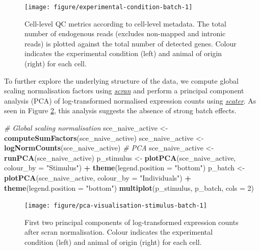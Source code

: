 \documentclass[9pt,a4paper,]{extarticle}
\newenvironment{Shaded}{\begin{snugshade}}{\end{snugshade}}
\newcommand{\CommentTok}[1]{\textcolor[rgb]{0.56,0.35,0.01}{\textit{#1}}}
\newcommand{\DataTypeTok}[1]{\textcolor[rgb]{0.13,0.29,0.53}{#1}}
\newcommand{\DecValTok}[1]{\textcolor[rgb]{0.00,0.00,0.81}{#1}}
\newcommand{\KeywordTok}[1]{\textcolor[rgb]{0.13,0.29,0.53}{\textbf{#1}}}
\newcommand{\NormalTok}[1]{#1}
\newcommand{\OperatorTok}[1]{\textcolor[rgb]{0.81,0.36,0.00}{\textbf{#1}}}
\newcommand{\StringTok}[1]{\textcolor[rgb]{0.31,0.60,0.02}{#1}}
\begin{document}
\begin{figure}

{\centering \texttt{[image: figure/experimental-condition-batch-1]} 

}

\caption{Cell-level QC metrics according to cell-level metadata. The total number of endogenous reads (excludes non-mapped and intronic reads) is plotted against the total number of detected genes. Colour indicates the experimental condition (left) and animal of origin (right) for each cell.}\label{fig:experimental-condition-batch}
\end{figure}

To further explore the underlying structure of the data, we compute global
scaling normalisation factors using \emph{\href{https://bioconductor.org/packages/3.11/scran}{scran}} and perform a
principal component analysis (PCA) of log-transformed normalised expression
counts using \emph{\href{https://bioconductor.org/packages/3.11/scater}{scater}}.
As seen in Figure \ref{fig:pca-visualisation-stimulus-batch}, this analysis
suggests the absence of strong batch effects.

\begin{Shaded}
\begin{Highlighting}[]
\CommentTok{# Global scaling normalisation}
\NormalTok{sce_naive_active <-}\StringTok{ }\KeywordTok{computeSumFactors}\NormalTok{(sce_naive_active)}
\NormalTok{sce_naive_active <-}\StringTok{ }\KeywordTok{logNormCounts}\NormalTok{(sce_naive_active)}
\CommentTok{# PCA }
\NormalTok{sce_naive_active <-}\StringTok{ }\KeywordTok{runPCA}\NormalTok{(sce_naive_active)}
\NormalTok{p_stimulus <-}\StringTok{ }\KeywordTok{plotPCA}\NormalTok{(sce_naive_active, }\DataTypeTok{colour_by =} \StringTok{"Stimulus"}\NormalTok{) }\OperatorTok{+}
\StringTok{  }\KeywordTok{theme}\NormalTok{(}\DataTypeTok{legend.position =} \StringTok{"bottom"}\NormalTok{)}
\NormalTok{p_batch <-}\StringTok{ }\KeywordTok{plotPCA}\NormalTok{(sce_naive_active, }\DataTypeTok{colour_by =} \StringTok{"Individuals"}\NormalTok{) }\OperatorTok{+}
\StringTok{  }\KeywordTok{theme}\NormalTok{(}\DataTypeTok{legend.position =} \StringTok{"bottom"}\NormalTok{)}
\KeywordTok{multiplot}\NormalTok{(p_stimulus, p_batch, }\DataTypeTok{cols =} \DecValTok{2}\NormalTok{)}
\end{Highlighting}
\end{Shaded}

\begin{figure}

{\centering \texttt{[image: figure/pca-visualisation-stimulus-batch-1]} 

}

\caption{First two principal components of log-transformed expression counts after scran normalisation. Colour indicates the experimental condition (left) and animal of origin (right) for each cell.}\label{fig:pca-visualisation-stimulus-batch}
\end{figure}
\end{document}
